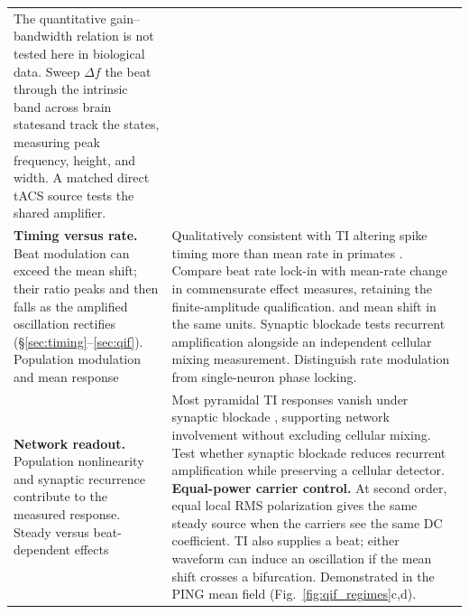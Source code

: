 \documentclass[11pt,a4paper]{article}
\providecommand{\DIFaddtex}[1]{{\protect\color{blue} \sf #1}} %
\providecommand{\DIFdeltex}[1]{{\protect\color{red} \scriptsize #1}} %
\providecommand{\DIFaddFL}[1]{\DIFadd{#1}} %
\providecommand{\DIFdelFL}[1]{\DIFdel{#1}} %
\providecommand{\DIFaddbeginFL}{} %
\providecommand{\DIFaddendFL}{} %
\providecommand{\DIFdelbeginFL}{} %
\providecommand{\DIFdelendFL}{} %
\providecommand{\DIFadd}[1]{\texorpdfstring{\DIFaddtex{#1}}{#1}} %
\providecommand{\DIFdel}[1]{\texorpdfstring{\DIFdeltex{#1}}{}} %
\begin{document}
\begin{table}[htbp]
\begin{tabular}{@{}>{\raggedright\arraybackslash}p{}
 >{\raggedright\arraybackslash}p{}@{}}
{generated drive and the recurrent gain \cite{ruffini2025cfc}.
}%
\DIFdelFL{The quantitative gain--bandwidth relation is not tested here in biological data.
}%
\DIFdelendFL Sweep \DIFdelbeginFL \DIFdelFL{$\Delta f$ }\DIFdelendFL \DIFaddbeginFL \DIFaddFL{the beat }\DIFaddendFL through the intrinsic band across
\DIFdelbeginFL \DIFdelFL{brain statesand track the
}\DIFdelendFL \DIFaddbeginFL \DIFaddFL{states, measuring }\DIFaddendFL peak frequency, height, and width. \DIFaddbeginFL \DIFaddFL{A matched direct tACS
source tests the shared amplifier. }\DIFaddendFL \\[4pt]
\DIFdelbeginFL \DIFdelFL{\textbf{Timing versus rate.} Beat modulation can exceed the mean shift; their ratio
peaks and then falls as the amplified oscillation rectifies
(\S\ref{sec:timing}--\ref{sec:qif}).
}\DIFdelendFL \DIFaddbeginFL \DIFaddFL{Population modulation and mean response }\DIFaddendFL & \DIFdelbeginFL \DIFdelFL{Qualitatively consistent with TI altering spike timing more than mean rate in
primates \cite{vieira2024}.
}%
\DIFdelendFL Compare \DIFdelbeginFL \DIFdelFL{beat }\DIFdelendFL \DIFaddbeginFL \DIFaddFL{rate }\DIFaddendFL lock-in \DIFdelbeginFL \DIFdelFL{with mean-rate change in commensurate effect measures,
retaining the finite-amplitude qualification. }\DIFdelendFL \DIFaddbeginFL \DIFaddFL{and mean shift
in the same units. Synaptic blockade tests recurrent amplification alongside
an independent cellular mixing measurement. Distinguish rate modulation from
single-neuron phase locking. }\DIFaddendFL \\[4pt]
\DIFdelbeginFL \DIFdelFL{\textbf{Network readout.} Population nonlinearity and synaptic recurrence contribute
to the measured response.
}\DIFdelendFL \DIFaddbeginFL \DIFaddFL{Steady versus beat-dependent effects }\DIFaddendFL & \DIFdelbeginFL \DIFdelFL{Most pyramidal TI responses vanish under synaptic blockade \cite{caldas2024},
supporting network involvement without excluding cellular mixing.
}%
\DIFdelFL{Test whether synaptic blockade reduces recurrent amplification while preserving
a cellular detector. }%
\DIFdelFL{\textbf{Equal-power carrier control.} At second order, equal local RMS
polarization gives the same steady source when the carriers see the same DC
coefficient. TI also supplies a beat; either waveform can induce an oscillation
if the mean shift crosses a bifurcation.
}%
\DIFdelFL{Demonstrated in the PING mean field (Fig.~\ref{fig:qif_regimes}c,d).
}
\end{tabular}
\end{table}
\end{document}
